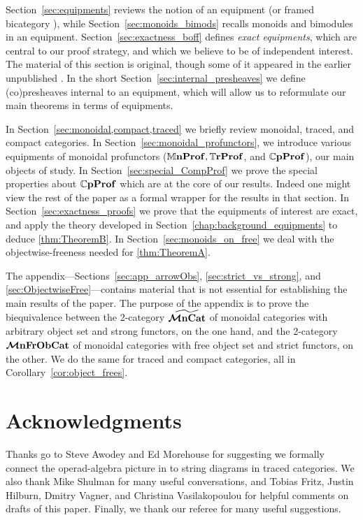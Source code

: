 \documentclass[11pt,oneside,article]{memoir}
\begin{document}
Section~\ref{sec:equipments} reviews the notion of an equipment (or framed bicategory
\cite{Shulman}), while Section~\ref{sec:monoids_bimods} recalls monoids and bimodules in an
equipment. Section~\ref{sec:exactness_boff} defines \emph{exact equipments}, which are central to
our proof strategy, and which we believe to be of independent interest. The material of this section
is original, though some of it appeared in the earlier unpublished \cite{Schultz2015}. In the short
Section~\ref{sec:internal_presheaves} we define (co)presheaves internal to an equipment, which will
allow us to reformulate our main theorems in terms of equipments.

In Section~\ref{sec:monoidal,compact,traced} we briefly review monoidal, traced, and compact
categories. In Section~\ref{sec:monoidal_profunctors}, we introduce various equipments of monoidal profunctors ($\mathbb{M}\mathbf{nProf}, \mathbb{T}\mathbf{rProf}$,
and $\mathbb{C}\mathbf{pProf}$), our main objects of study. In
Section~\ref{sec:special_CompProf} we prove the special properties about $\mathbb{C}\mathbf{pProf}$ which are at
the core of our results. Indeed one might view the rest of the paper as a formal wrapper for the
results in that section. In Section~\ref{sec:exactness_proofs} we prove that the equipments of
interest are exact, and apply the theory developed in Section~\ref{chap:background_equipments} to
deduce \ref{thm:TheoremB}. In Section~\ref{sec:monoids_on_free} we deal with the objectwise-freeness
needed for \ref{thm:TheoremA}.

The appendix---Sections~\ref{sec:app_arrowObs}, \ref{sec:strict_vs_strong}, and \ref{sec:ObjectwiseFree}---contains material that is not essential for establishing the main results of the paper. The purpose of the appendix is to prove the
biequivalence between the 2-category $\widetilde{\bm{\mathcal{M}}\mathbf{nCat}}$ of monoidal categories with arbitrary object
set and strong functors, on the one hand, and the 2-category $\bm{\mathcal{M}}\mathbf{nFrObCat}$ of monoidal categories
with free object set and strict functors, on the other. We do the same for traced and compact categories, all in
Corollary~\ref{cor:object_frees}.

\section*{Acknowledgments}

Thanks go to Steve Awodey and Ed Morehouse for suggesting we formally connect the operad-algebra
picture in \cite{RupelSpivak} to string diagrams in traced categories. We also thank Mike Shulman
for many useful conversations, and Tobias Fritz, Justin Hilburn, Dmitry Vagner, and Christina
Vasilakopoulou for helpful comments on drafts of this paper. Finally, we thank our referee for many
useful suggestions.
\end{document}
